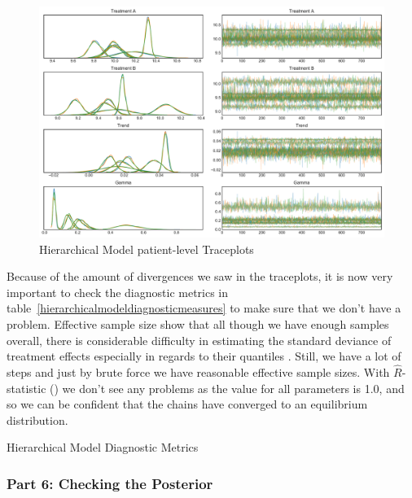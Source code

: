 \documentclass[12pt,a4paper,leqno]{report}
\theoremstyle{plain}
\theoremstyle{definition}
\theoremstyle{remark}
\begin{document}
\bigskip
\begin{figure}[H]
    \caption{Hierarchical Model patient-level Traceplots}\label{hierarchicalmodelpatienttraceplots}
    \bigskip
    \includegraphics[width=\textwidth,height=\textheight,keepaspectratio]{hierarchical_model_patient_level_traceplot.pdf}
\end{figure}
\bigskip

Because of the amount of divergences we saw in the traceplots, it is now very important to
check the diagnostic metrics in table\ \ref{hierarchicalmodeldiagnosticmeasures} to make
sure that we don't have a problem. Effective sample size  show that all
though we have enough samples overall, there is considerable difficulty in estimating
the standard deviance of treatment effects especially in regards to their
quantiles . Still, we have a lot of
steps and just by brute force we have reasonable effective sample sizes. With
\(\hat{R}\)-statistic () we don't see any problems as
the value for all parameters is 1.0, and so we can be confident that the chains have converged to
an equilibrium distribution.


\bigskip
\begin{table}[H]
    \caption{Hierarchical Model Diagnostic Metrics}\label{hierarchicalmodeldiagnosticmeasures}
    \bigskip
    \centering
    \resizebox{!}{3.2in}{%
    
    }
\end{table}
\smallskip

\subsubsection*{Part 6: Checking the Posterior}
\end{document}
